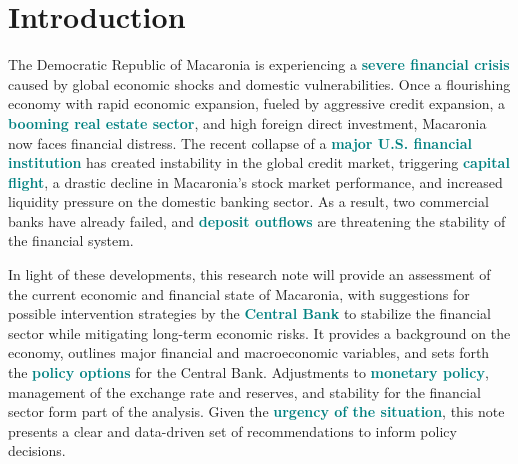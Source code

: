 \section*{Introduction}



The Democratic Republic of Macaronia is experiencing a \textbf{\textcolor{teal}{severe financial crisis}} caused by global economic shocks and domestic vulnerabilities. Once a flourishing economy with rapid economic expansion, fueled by aggressive credit expansion, a \textbf{\textcolor{teal}{booming real estate sector}}, and high foreign direct investment, Macaronia now faces financial distress. The recent collapse of a \textbf{\textcolor{teal}{major U.S. financial institution}} has created instability in the global credit market, triggering \textbf{\textcolor{teal}{capital flight}}, a drastic decline in Macaronia’s stock market performance, and increased liquidity pressure on the domestic banking sector. As a result, two commercial banks have already failed, and \textbf{\textcolor{teal}{deposit outflows}} are threatening the stability of the financial system.  

In light of these developments, this research note will provide an assessment of the current economic and financial state of Macaronia, with suggestions for possible intervention strategies by the \textbf{\textcolor{teal}{Central Bank}} to stabilize the financial sector while mitigating long-term economic risks. It provides a background on the economy, outlines major financial and macroeconomic variables, and sets forth the \textbf{\textcolor{teal}{policy options}} for the Central Bank. Adjustments to \textbf{\textcolor{teal}{monetary policy}}, management of the exchange rate and reserves, and stability for the financial sector form part of the analysis. Given the \textbf{\textcolor{teal}{urgency of the situation}}, this note presents a clear and data-driven set of recommendations to inform policy decisions.
